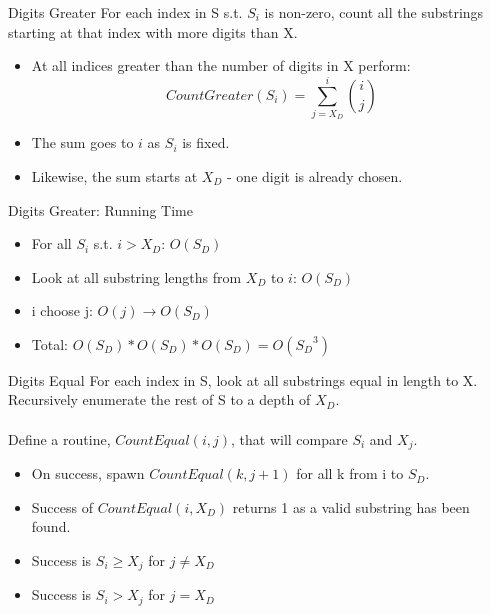 \documentclass[10pt]{beamer}
\begin{document}
\begin{frame}{Digits Greater}
  \large
  For each index in S s.t. $S_{i}$ is non-zero, count all the substrings starting at that index with more digits than X.
  \begin{itemize} %
    \item At all indices greater than the number of digits in X perform:
      \begin{equation*}
        CountGreater(S_{i}) = \sum_{j = X_{D}}^{i} \binom{i}{j}
      \end{equation*}
    \item The sum goes to $i$ as $S_{i}$ is fixed.
    \item Likewise, the sum starts at $X_{D}$ \-- one digit is already chosen.
  \end{itemize}
\end{frame}

\begin{frame}{Digits Greater: Running Time}
  \large
  \begin{itemize} %
    \item For all $S_{i}$ s.t. $i > X_{D}$: $O(S_D)$
    \item Look at all substring lengths from $X_D$ to $i$: $O(S_D)$
    \item i choose j: $O(j) \rightarrow O(S_D)$
    \item Total: $O(S_D)*O(S_D)*O(S_D) = O({S_{D}}^{3})$
  \end{itemize}
\end{frame}

\begin{frame}{Digits Equal}
  \large
  For each index in S, look at all substrings equal in length to X.
  Recursively enumerate the rest of S to a depth of $X_{D}$. \\ \\
  Define a routine, $CountEqual(i,j)$, that will compare $S_{i}$ and $X_{j}$.
  \begin{itemize}
    \item On success, spawn $CountEqual(k, j + 1)$ for all k from i to $S_{D}$.
    \item Success of $CountEqual(i, X_{D})$ returns 1 as a valid substring has been found.
    \item Success is $S_{i} \ge X_{j}$ for $j \ne X_{D}$
    \item Success is $S_{i} > X_{j}$ for $j = X_{D}$
  \end{itemize}
\end{frame}
\end{document}
